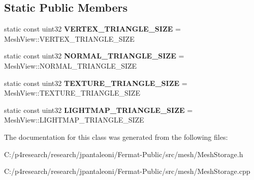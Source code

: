 \subsection*{Static Public Members}
\begin{DoxyCompactItemize}
\item 
\mbox{\label{class_mesh_storage_a2c7de566b76991ab1c2a164c8aeeef35}} 
static const uint32 {\bfseries V\+E\+R\+T\+E\+X\+\_\+\+T\+R\+I\+A\+N\+G\+L\+E\+\_\+\+S\+I\+ZE} = Mesh\+View\+::\+V\+E\+R\+T\+E\+X\+\_\+\+T\+R\+I\+A\+N\+G\+L\+E\+\_\+\+S\+I\+ZE
\item 
\mbox{\label{class_mesh_storage_a5386a8b4ef710ee288eae8d36f0c00c9}} 
static const uint32 {\bfseries N\+O\+R\+M\+A\+L\+\_\+\+T\+R\+I\+A\+N\+G\+L\+E\+\_\+\+S\+I\+ZE} = Mesh\+View\+::\+N\+O\+R\+M\+A\+L\+\_\+\+T\+R\+I\+A\+N\+G\+L\+E\+\_\+\+S\+I\+ZE
\item 
\mbox{\label{class_mesh_storage_a0f0e6fea91d1974881285f39d34988ab}} 
static const uint32 {\bfseries T\+E\+X\+T\+U\+R\+E\+\_\+\+T\+R\+I\+A\+N\+G\+L\+E\+\_\+\+S\+I\+ZE} = Mesh\+View\+::\+T\+E\+X\+T\+U\+R\+E\+\_\+\+T\+R\+I\+A\+N\+G\+L\+E\+\_\+\+S\+I\+ZE
\item 
\mbox{\label{class_mesh_storage_a791c914f7f07963836914dcc87c14a98}} 
static const uint32 {\bfseries L\+I\+G\+H\+T\+M\+A\+P\+\_\+\+T\+R\+I\+A\+N\+G\+L\+E\+\_\+\+S\+I\+ZE} = Mesh\+View\+::\+L\+I\+G\+H\+T\+M\+A\+P\+\_\+\+T\+R\+I\+A\+N\+G\+L\+E\+\_\+\+S\+I\+ZE
\end{DoxyCompactItemize}


The documentation for this class was generated from the following files\+:\begin{DoxyCompactItemize}
\item 
C\+:/p4research/research/jpantaleoni/\+Fermat-\/\+Public/src/mesh/Mesh\+Storage.\+h\item 
C\+:/p4research/research/jpantaleoni/\+Fermat-\/\+Public/src/mesh/Mesh\+Storage.\+cpp\end{DoxyCompactItemize}
